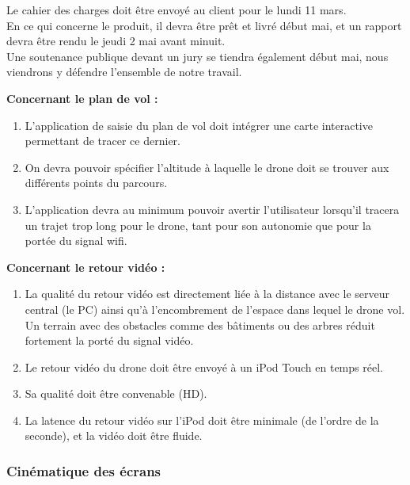 \documentclass{article}
\begin{document}
		Le cahier des charges doit être envoyé au client pour le lundi 11 mars.\\
		En ce qui concerne le produit, il devra être prêt et livré début mai, et un rapport devra être rendu le jeudi 2 mai avant minuit.\\
		Une soutenance publique devant un jury se tiendra également début mai, nous viendrons y défendre l'ensemble de notre travail.\\
		
	    \begin{flushleft}
	    \textbf{Concernant le plan de vol :} 
	    \end{flushleft}
	    	\begin{enumerate}
            	\item  L'application de saisie du plan de vol doit intégrer une carte interactive permettant de tracer ce dernier.
    		 	\item On devra pouvoir spécifier l'altitude à laquelle le drone doit se trouver aux différents points du parcours.
    		 	\item L'application devra au minimum pouvoir avertir l'utilisateur lorsqu'il tracera un trajet trop long pour le drone, tant pour son autonomie que pour la portée du signal wifi.
		 	\end{enumerate}
		
	    \begin{flushleft}
	    \textbf{Concernant le retour vidéo :}
	    \end{flushleft}
	     	\begin{enumerate}
	     	\item La qualité du retour vidéo est directement liée à la distance avec le serveur central (le PC) ainsi qu'à l'encombrement de l'espace dans lequel le drone vol. Un terrain avec des obstacles comme des bâtiments ou des arbres réduit fortement la porté du signal vidéo.
	     	\item Le retour vidéo du drone doit être envoyé à un iPod Touch en temps réel.
	     	\item Sa qualité doit être convenable (HD).
		 	\item La latence du retour vidéo sur l'iPod doit être minimale (de l'ordre de la seconde), et la vidéo doit être fluide.
		 	\end{enumerate}
\newpage
\subsubsection{Cinématique des écrans}
	
\end{document}
